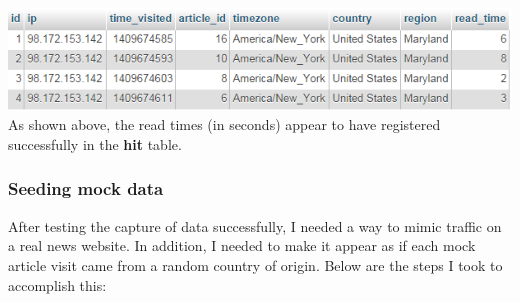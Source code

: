 \documentclass[12pt]{article}
\begin{document}
\noindent\includegraphics[scale=1]{img/results_hits} \\
\noindent As shown above, the read times (in seconds) appear to have registered successfully in the \textbf{hit} table. 

\subsubsection{Seeding mock data}
After testing the capture of data successfully, I needed a way to mimic traffic on a real news website. In addition, I needed to make it appear as if each mock article visit came from a random country of origin. Below are the steps I took to accomplish this:
\end{document}

